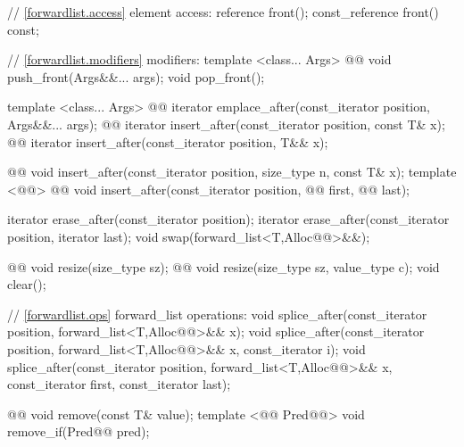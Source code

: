 \documentclass[american,twoside]{book}
\begin{document}
\begin{codeblock}
{{    // \ref{forwardlist.access} element access: 
    reference front(); 
    const_reference front() const; 

    // \ref{forwardlist.modifiers} modifiers: 
    template <class... Args> 
      @@ 
      void push_front(Args&&... args); 
    void pop_front();
   
    template <class... Args> 
      @@ 
      iterator emplace_after(const_iterator position, Args&&... args);
    @@ 
      iterator insert_after(const_iterator position, const T& x);
    @@ 
      iterator insert_after(const_iterator position, T&& x);

    @@ 
      void insert_after(const_iterator position, size_type n, const T& x); 
    template <@@> 
      @@
      void insert_after(const_iterator position, @@ first, @@ last);

    iterator erase_after(const_iterator position); 
    iterator erase_after(const_iterator position, iterator last); 
    void swap(forward_list<T,Alloc@@>&&);

    @@ void resize(size_type sz);
    @@ void resize(size_type sz, value_type c);
    void clear(); 

    // \ref{forwardlist.ops} forward_list operations: 
    void splice_after(const_iterator position, forward_list<T,Alloc@@>&& x); 
    void splice_after(const_iterator position, forward_list<T,Alloc@@>&& x,
                      const_iterator i); 
    void splice_after(const_iterator position, forward_list<T,Alloc@@>&& x,
                      const_iterator first, const_iterator last); 

    @@ void remove(const T& value); 
    template <@@ Pred@@> void remove_if(Pred@@ pred); 

}}
\end{codeblock}
\end{document}
